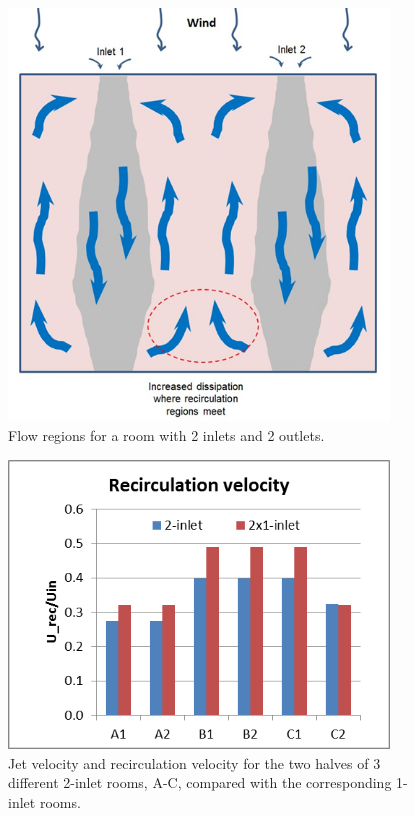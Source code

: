 \begin{figure}[hbtp] %
\centering
\includegraphics[width=0.9\textwidth, height=0.9\textheight, keepaspectratio=true]{media/image2660.png}
\caption{Flow regions for a room with 2 inlets and 2 outlets. \protect \label{fig:flow-regions-for-a-room-with-2-inlets-and-2}}
\end{figure}

\begin{figure}[hbtp] %
\centering
\includegraphics[width=0.9\textwidth, height=0.9\textheight, keepaspectratio=true]{media/image2662.png}
\caption{Jet velocity and recirculation velocity for the two halves of 3 different 2-inlet rooms, A-C, compared with the corresponding 1-inlet rooms. \protect \label{fig:jet-velocity-and-recirculation-velocity-for}}
\end{figure}

